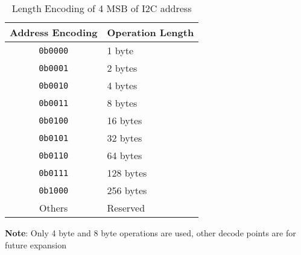 \begin{table}[h]
  \begin{center}
    \begin{tabular}{ c | l }
      Address Encoding & Operation Length \\
      \hline
      \texttt{0b0000}  & 1 byte           \\
      \texttt{0b0001}  & 2 bytes          \\
      \texttt{0b0010}  & 4 bytes          \\
      \texttt{0b0011}  & 8 bytes          \\
      \texttt{0b0100}  & 16 bytes         \\
      \texttt{0b0101}  & 32 bytes         \\
      \texttt{0b0110}  & 64 bytes         \\
      \texttt{0b0111}  & 128 bytes        \\
      \texttt{0b1000}  & 256 bytes        \\
      Others           & Reserved         \\
    \end{tabular}
  \end{center}
  \textbf{Note}: Only 4 byte and 8 byte operations are used, other decode points are for future expansion
  \caption[Length Encoding of 4 MSB of I2C address]{\label{table:i2c_address_length_encoding}Length Encoding of 4 MSB of I2C address
  }
\end{table}

